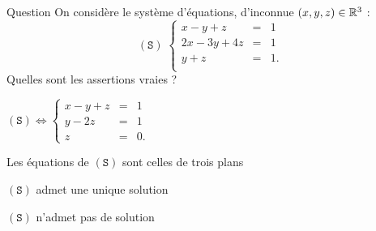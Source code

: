 \begin{multi}[multiple,feedback=
{\[(\mathtt{S}) \Leftrightarrow  \left\{\begin{array}{rcc}
x-y+z&=&1\\
y-2z&=&1\\ 
z&=&0.\\ 
\end{array}\right.\]
Donc \((\mathtt{S})\) admet une unique solution : \((2,1,0)\).
}]{Question}
On considère le système d'équations, d'inconnue \((x,y,z)\in \mathbb{R}^3\) :  
\[(\mathtt{S}) \; \left\{\begin{array}{rcc}
x-y+z&=&1\\
2x-3y+4z&=&1\\ 
y+z&=&1.\\
\end{array}\right.\]
Quelles sont les assertions vraies ?

    \item* \((\mathtt{S}) \Leftrightarrow  \left\{\begin{array}{rcc}
x-y+z&=&1\\
y-2z&=&1\\
z&=&0.\end{array}\right.\)
    \item* Les équations de \((\mathtt{S})\) sont celles de trois plans
    \item* \((\mathtt{S})\) admet une unique solution
    \item \((\mathtt{S})\) n'admet pas de solution
\end{multi}


